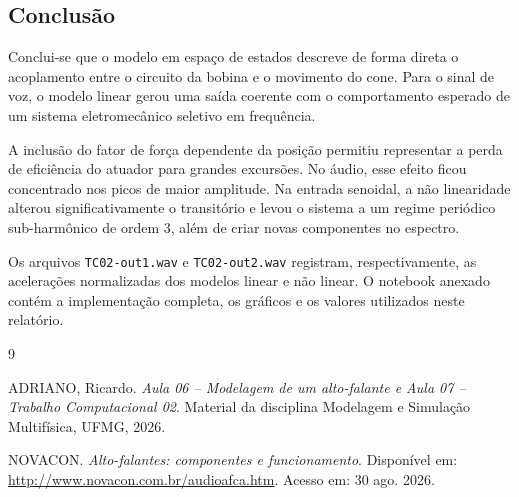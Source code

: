 \documentclass[12pt,letterpaper]{article}
\begin{document}
\subsection{Conclusão}

Conclui-se que o modelo em espaço de estados descreve de forma direta o
acoplamento entre o circuito da bobina e o movimento do cone. Para o sinal de
voz, o modelo linear gerou uma saída coerente com o comportamento esperado de
um sistema eletromecânico seletivo em frequência.

A inclusão do fator de força dependente da posição permitiu representar a perda
de eficiência do atuador para grandes excursões. No áudio, esse efeito ficou
concentrado nos picos de maior amplitude. Na entrada senoidal, a não linearidade
alterou significativamente o transitório e levou o sistema a um regime
periódico sub-harmônico de ordem 3, além de criar novas componentes no espectro.

Os arquivos \texttt{TC02-out1.wav} e \texttt{TC02-out2.wav} registram,
respectivamente, as acelerações normalizadas dos modelos linear e não linear.
O notebook anexado contém a implementação completa, os gráficos e os valores
utilizados neste relatório.

\begin{thebibliography}{9}

ADRIANO, Ricardo.
\textit{Aula 06 -- Modelagem de um alto-falante e Aula 07 -- Trabalho
Computacional 02}.
Material da disciplina Modelagem e Simulação Multifísica, UFMG, 2026.

NOVACON.
\textit{Alto-falantes: componentes e funcionamento}.
Disponível em: \url{http://www.novacon.com.br/audioafca.htm}.
Acesso em: 30 ago. 2026.

\end{thebibliography}
\end{document}
